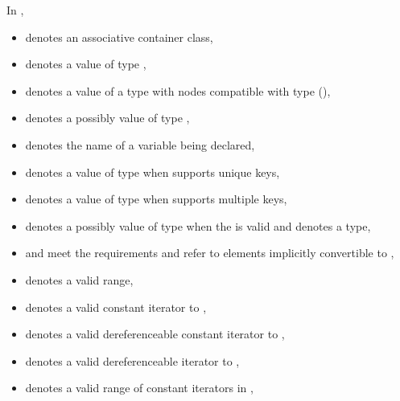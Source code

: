 \documentclass{wg21}
\begin{document}
\pnum
In ,
\begin{itemize}
    \item
     denotes an associative container class,
    \item
     denotes a value of type ,
    \item
     denotes a value of a type with nodes compatible with type
     (),
    \item
     denotes a possibly  value of type ,
    \item
     denotes the name of a variable being declared,
    \item
     denotes a value of type 
    when  supports unique keys,
    \item
     denotes a value of type 
    when  supports multiple keys,
    \item
     denotes a possibly  value of type 
    when the 
     is valid
    and denotes a type,
    \item
     and 
    meet the  requirements and refer to elements
    implicitly convertible to
    ,
    \item
     denotes a valid range,
    \item
     denotes a valid constant iterator to ,
    \item
     denotes a valid dereferenceable constant iterator to ,
    \item
     denotes a valid dereferenceable iterator to ,
    \item
    \tcode{[q1, q2)} denotes a valid range of constant iterators in ,

\end{itemize}
\end{document}
